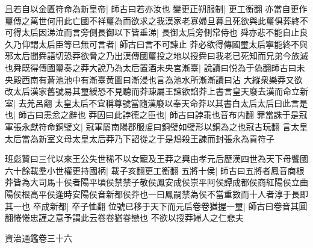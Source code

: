 且若自以金匱符命為新皇帝|{
	師古曰若亦汝也}
變更正朔服制|{
	更工衡翻}
亦當自更作璽傳之萬世何用此亡國不祥璽為而欲求之我漢家老寡婦旦暮且死欲與此璽俱葬終不可得太后因涕泣而言旁側長御以下皆垂涕|{
	長御太后旁側常侍也}
舜亦悲不能自止良久乃仰謂太后臣等已無可言者|{
	師古曰言不可諫止}
莽必欲得傳國璽太后寧能終不與邪太后聞舜語切恐莽欲脅之乃出漢傳國璽投之地以授舜曰我老已死知而兄弟今族滅也舜既得傳國璽奏之莽大說乃為太后置酒未央宮漸臺|{
	說讀曰悦為于偽翻師古曰未央殿西南有蒼池池中有漸臺黄圖曰漸浸也言為池水所漸漸讀曰沾}
大縱衆樂莽又欲改太后漢家舊號易其璽綬恐不見聽而莽疎屬王諫欲諂莽上書言皇天廢去漢而命立新室|{
	去羌呂翻}
太皇太后不宜稱尊號當隨漢廢以奉天命莽以其書白太后太后曰此言是也|{
	師古曰恚忿之辭也}
莽因曰此誖德之臣也|{
	師古曰誖乖也音布内翻}
罪當誅于是冠軍張永獻符命銅璧文|{
	冠軍屬南陽郡服䖍曰銅璧如璧形以銅為之也冠古玩翻}
言太皇太后當為新室文母太皇太后莽乃下詔從之于是鴆殺王諫而封張永為貢符子

班彪贊曰三代以來王公失世稀不以女寵及王莽之興由孝元后歷漢四世為天下母饗國六十餘載羣小世權更持國柄|{
	載子亥翻更工衡翻}
五將十侯|{
	師古曰五將者鳳音商根莽皆為大司馬十侯者陽平頃侯禁禁子敬侯鳳安成侯崇平阿侯譚成都侯商紅陽侯立曲陽侯根高平侯逢時安陽侯音新都侯莽也一曰鳳嗣禁為侯不當重數而十人者淳于長即其一也}
卒成新都|{
	卒子恤翻}
位號已移于天下而元后卷卷猶握一璽|{
	師古曰卷音其圓翻惓惓忠謹之意予謂此云卷卷猶眷戀也}
不欲以授莽婦人之仁悲夫

資治通鑑卷三十六
